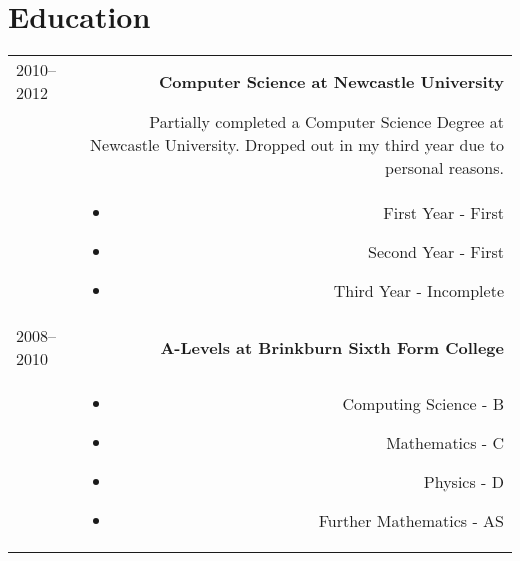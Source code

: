 \documentclass[10pt]{article}
\begin{document}
\section*{Education}
\begin{tabular}{L!{\VRule}R}
2010--2012&{\bf Computer Science at Newcastle University}\\
&Partially completed a Computer Science Degree at Newcastle University. Dropped out in my third year due to personal reasons.\\
&\begin{itemize}
\item First Year - First
\item Second Year - First
\item Third Year - Incomplete
\end{itemize}\\
2008--2010&{\bf A-Levels at Brinkburn Sixth Form College}\\
&\begin{itemize}
\item Computing Science - B
\item Mathematics - C
\item Physics - D
\item Further Mathematics - AS
\end{itemize}\\
\end{tabular}
\end{document}
